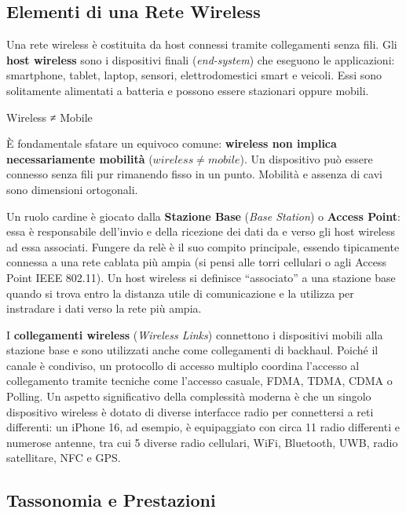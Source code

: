 \documentclass[
  italian,
  openany]{book}
\begin{document}
\subsection{Elementi di una Rete
Wireless}\label{elementi-di-una-rete-wireless}

Una rete wireless è costituita da host connessi tramite collegamenti
senza fili. Gli \textbf{host wireless} sono i dispositivi finali
(\emph{end-system}) che eseguono le applicazioni: smartphone, tablet,
laptop, sensori, elettrodomestici smart e veicoli. Essi sono solitamente
alimentati a batteria e possono essere stazionari oppure mobili.

\begin{calloutwarning}{Wireless ≠ Mobile}

È fondamentale sfatare un equivoco comune: \textbf{wireless non implica
necessariamente mobilità} (\(wireless \neq mobile\)). Un dispositivo può
essere connesso senza fili pur rimanendo fisso in un punto. Mobilità e
assenza di cavi sono dimensioni ortogonali.

\end{calloutwarning}

Un ruolo cardine è giocato dalla \textbf{Stazione Base} (\emph{Base
Station}) o \textbf{Access Point}: essa è responsabile dell'invio e
della ricezione dei dati da e verso gli host wireless ad essa associati.
Fungere da relè è il suo compito principale, essendo tipicamente
connessa a una rete cablata più ampia (si pensi alle torri cellulari o
agli Access Point IEEE 802.11). Un host wireless si definisce
``associato'' a una stazione base quando si trova entro la distanza
utile di comunicazione e la utilizza per instradare i dati verso la rete
più ampia.

I \textbf{collegamenti wireless} (\emph{Wireless Links}) connettono i
dispositivi mobili alla stazione base e sono utilizzati anche come
collegamenti di backhaul. Poiché il canale è condiviso, un protocollo di
accesso multiplo coordina l'accesso al collegamento tramite tecniche
come l'accesso casuale, FDMA, TDMA, CDMA o Polling. Un aspetto
significativo della complessità moderna è che un singolo dispositivo
wireless è dotato di diverse interfacce radio per connettersi a reti
differenti: un iPhone 16, ad esempio, è equipaggiato con circa 11 radio
differenti e numerose antenne, tra cui 5 diverse radio cellulari, WiFi,
Bluetooth, UWB, radio satellitare, NFC e GPS.

\subsection{Tassonomia e Prestazioni}\label{tassonomia-e-prestazioni}
\end{document}
